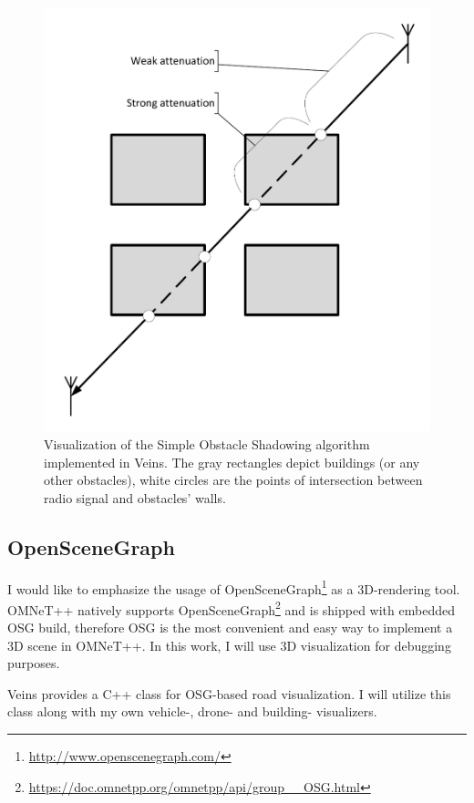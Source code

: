 \documentclass[]{nsm-thesis}
\begin{document}
\begin{figure}
	\centering
	\includegraphics[width=1\textwidth]{figures/SimpleObstacleShadowing.pdf}
	\caption{Visualization of the Simple Obstacle Shadowing algorithm implemented in Veins. The gray rectangles depict buildings (or any other obstacles), white circles are the points of intersection between radio signal and obstacles' walls.}
	\label{fig:SimpleObstacleShadowing}
\end{figure}



\subsection{OpenSceneGraph}

I would like to emphasize the usage of OpenSceneGraph\footnote{\url{http://www.openscenegraph.com/}} as a 3D-rendering tool. OMNeT++ natively supports OpenSceneGraph\footnote{\url{https://doc.omnetpp.org/omnetpp/api/group__OSG.html}} and is shipped with embedded \ac{OSG} build, therefore \ac{OSG} is the most convenient and easy way to implement a 3D scene in OMNeT++. In this work, I will use 3D visualization for debugging purposes.

Veins provides a C++ class for \ac{OSG}-based road visualization. I will utilize this class along with my own vehicle-, drone- and building- visualizers.
\end{document}
